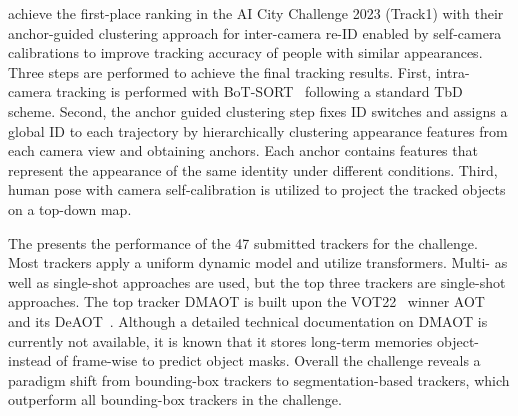 \textcite{Huang23b} achieve the first-place ranking in the AI City Challenge 2023 (Track1) with their anchor-guided clustering approach for inter-camera re-ID enabled by self-camera calibrations to improve tracking accuracy of people with similar appearances. Three steps are performed to achieve the final tracking results. First, intra-camera tracking is performed with BoT-SORT~\cite{Aharon22} following a standard TbD scheme. Second, the anchor guided clustering step fixes ID switches and assigns a global ID to each trajectory by hierarchically clustering appearance features from each camera view and obtaining anchors. Each anchor contains features that represent the appearance of the same identity under different conditions. Third, human pose with camera self-calibration is utilized to project the tracked objects on a top-down map.

The  presents the performance of the 47 submitted trackers for the challenge. Most trackers apply a uniform dynamic model and utilize transformers.
Multi- as well as single-shot approaches are used, but the top three trackers are single-shot approaches. The top tracker DMAOT is built upon the VOT22~\cite{Kristan22} winner AOT~\cite{Yang21} and its  DeAOT~\cite{Yang22b}. Although a detailed technical documentation on DMAOT is currently not available, it is known that it stores long-term memories object- instead of frame-wise to predict object masks. Overall the challenge reveals a paradigm shift from bounding-box trackers to segmentation-based trackers, which outperform all bounding-box trackers in the challenge.